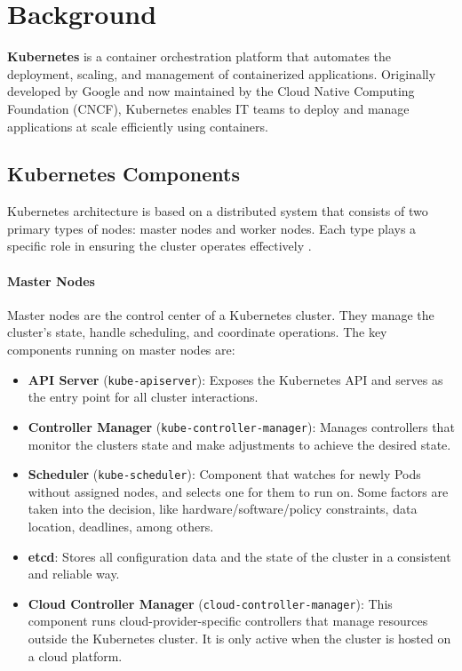 \documentclass[a4paper,11pt,openright,BCOR=15mm]{scrbook}
\begin{document}
	


\chapter{Background}

\textbf{Kubernetes} is a container orchestration platform that automates the deployment, scaling, and management of containerized applications. Originally developed by Google and now maintained by the Cloud Native Computing Foundation (CNCF), Kubernetes enables IT teams to deploy and manage applications at scale efficiently using containers.


\section{Kubernetes Components}

Kubernetes architecture is based on a distributed system that consists of two primary types of nodes: master nodes and worker nodes. Each type plays a specific role in ensuring the cluster operates effectively \cite{the_linux_foundation_kubernetes_2024}.

\subsubsection{Master Nodes}\label{sect:masters}
Master nodes are the control center of a Kubernetes cluster. They manage the cluster’s state, handle scheduling, and coordinate operations. The key components running on master nodes are:

\begin{itemize}
	\item \textbf{API Server} (\texttt{kube-apiserver}): Exposes the Kubernetes API and serves as the entry point for all cluster interactions.
	\item \textbf{Controller Manager} (\texttt{kube-controller-manager}): Manages controllers that monitor the clusters state and make adjustments to achieve the desired state.
	\item \textbf{Scheduler} (\texttt{kube-scheduler}): Component that watches for newly Pods without assigned nodes, and selects one for them to run on. Some factors are taken into the decision, like hardware/software/policy constraints, data location, deadlines, among others.
	\item \textbf{etcd}: Stores all configuration data and the state of the cluster in a consistent and reliable way.
	\item \textbf{Cloud Controller Manager} (\texttt{cloud-controller-manager}): This component runs cloud-provider-specific controllers that manage resources outside the Kubernetes cluster. It is only active when the cluster is hosted on a cloud platform.
\end{itemize}
\end{document}
